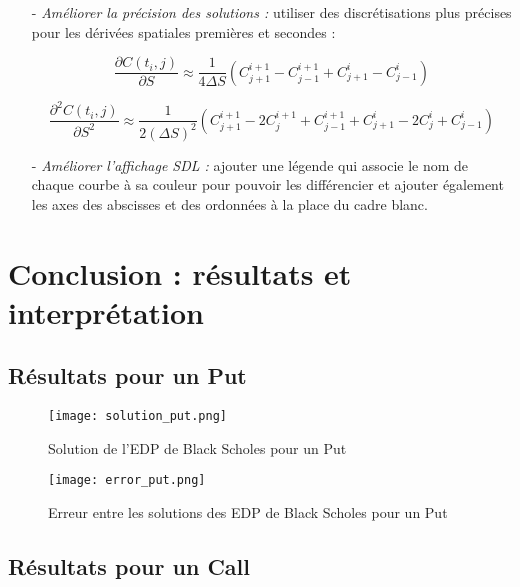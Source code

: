 \documentclass[11pt,a4paper]{article}
\begin{document}
\begin{itemize}
    \item[-] \emph{Améliorer la précision des solutions :} utiliser des discrétisations plus précises pour les dérivées spatiales premières et secondes :\vspace{0.5cm}

    $$\frac{\partial C(t_{i},j)}{\partial S} \approx \frac{1}{4 \Delta S} (C_{j+1}^{i+1} - C_{j-1}^{i+1} + C_{j+1}^{i} - C_{j-1}^{i})$$\vspace{0.5cm}
    
    $$\frac{\partial^2 C(t_{i},j)}{\partial S^2} \approx \frac{1}{2 (\Delta S)^2} (C_{j+1}^{i+1} -2C_{j}^{i+1} + C_{j-1}^{i+1} + C_{j+1}^{i} -2C_{j}^{i} + C_{j-1}^{i})$$\vspace{0.5cm}
    
    \item[-] \emph{Améliorer l'affichage SDL :} ajouter une légende qui associe le nom de chaque courbe à sa couleur pour pouvoir les différencier et ajouter également les axes des abscisses et des ordonnées à la place du cadre blanc.
\end{itemize}

\newpage

\section{Conclusion : résultats et interprétation}

\subsection{Résultats pour un Put}

\begin{figure}[!ht]
    \centering
    \texttt{[image: solution\_put.png]}
    \caption{Solution de l'EDP de Black Scholes pour un Put}
\end{figure}

\vspace{0.4cm}

\begin{figure}[!ht]
    \centering
    \texttt{[image: error\_put.png]}
    \caption{Erreur entre les solutions des EDP de Black Scholes pour un Put}
\end{figure}

\newpage

\subsection{Résultats pour un Call}
\end{document}
